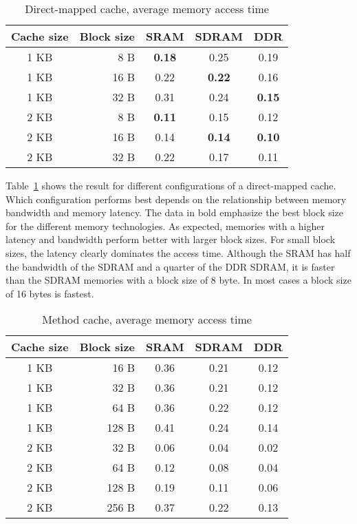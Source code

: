 \begin{table}
    \centering
    \caption{Direct-mapped cache, average memory access time}
    \label{tab:direct:mapped}
    \begin{tabular}{crccc}
    \toprule

    Cache size & \multicolumn{1}{c}{Block size} & SRAM & SDRAM & DDR \\

    \midrule

    1 KB & 8 B & \textbf{0.18} & 0.25 & 0.19 \\
    1 KB & 16 B & 0.22 & \textbf{0.22} & 0.16 \\
    1 KB & 32 B & 0.31 & 0.24 & \textbf{0.15} \\
    \cmidrule{1-5}
    2 KB & 8 B & \textbf{0.11} & 0.15 & 0.12 \\
    2 KB & 16 B & 0.14 & \textbf{0.14} & \textbf{0.10} \\
    2 KB & 32 B & 0.22 & 0.17 & 0.11 \\

    \bottomrule

    \end{tabular}
\end{table}

Table~\ref{tab:direct:mapped} shows the result for different
configurations of a direct-mapped cache. Which configuration performs
best depends on the relationship between memory bandwidth and memory
latency. The data in bold emphasize the best block size for the
different memory technologies. As expected, memories with a higher
latency and bandwidth perform better with larger block sizes. For
small block sizes, the latency clearly dominates the access time.
Although the SRAM has half the bandwidth of the SDRAM and a quarter
of the DDR SDRAM, it is faster than the SDRAM memories with a block
size of 8 byte. In most cases a block size of 16 bytes is fastest.

\begin{table}
    \centering
    \caption{Method cache, average memory access time}
    \label{tab:mcache}
    \begin{tabular}{crccc}
    \toprule

    Cache size & \multicolumn{1}{c}{Block size} & SRAM & SDRAM & DDR \\

    \midrule
        1 KB & 16 B & 0.36 & 0.21 & 0.12 \\
        1 KB & 32 B & 0.36 & 0.21 & 0.12 \\
        1 KB & 64 B & 0.36 & 0.22 & 0.12 \\
        1 KB & 128 B & 0.41 & 0.24 & 0.14 \\
        \cmidrule{1-5}
        2 KB & 32 B & 0.06 & 0.04 & 0.02 \\
        2 KB & 64 B& 0.12 & 0.08 & 0.04 \\
        2 KB & 128 B & 0.19 & 0.11 & 0.06 \\
        2 KB & 256 B & 0.37 & 0.22 & 0.13 \\
    \bottomrule

    \end{tabular}
\end{table}

